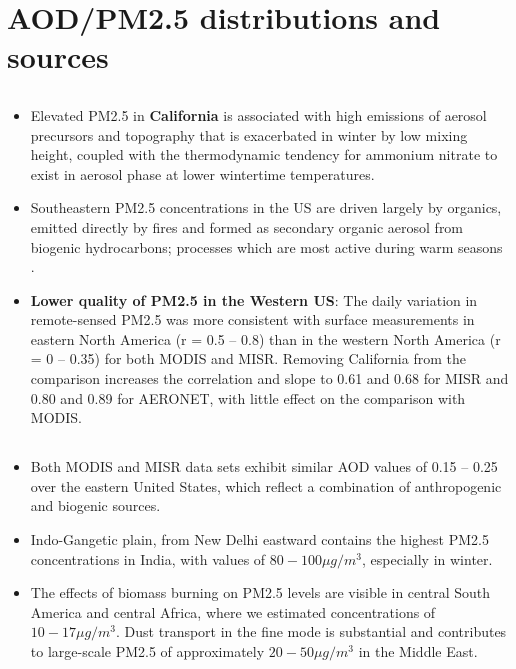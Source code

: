 \documentclass[11pt]{article}
\begin{document}

\section{AOD/PM2.5 distributions and sources}

\subsection{\citet{van2006estimating}}
\begin{itemize}
    \item Elevated PM2.5 in \textbf{California} is associated with high emissions of aerosol precursors and topography that is exacerbated in winter by low mixing height, coupled with the thermodynamic tendency for ammonium nitrate to exist in aerosol phase at lower wintertime temperatures. 
    \item Southeastern PM2.5 concentrations in the US are driven largely by organics, emitted directly by fires and formed as secondary organic aerosol from biogenic hydrocarbons; processes which are most active during warm seasons \citep{malm2004spatial}.
    \item \textbf{Lower quality of PM2.5 in the Western US}: The daily variation in remote-sensed PM2.5 was more consistent with surface measurements in eastern North America (r = 0.5 -- 0.8) than in the western North America (r = 0 -- 0.35) for both MODIS and MISR.  Removing California from the comparison increases the correlation and slope to 0.61 and 0.68 for MISR and 0.80 and 0.89 for AERONET, with little effect on the comparison with MODIS.
\end{itemize}

\subsection{\citet{van2010global}}
\begin{itemize}
    \item Both MODIS and MISR data sets exhibit similar AOD values of 0.15 -- 0.25 over the eastern United States, which reflect a combination of anthropogenic and biogenic sources.
    \item Indo-Gangetic plain, from New Delhi eastward contains the highest PM2.5 concentrations in India, with values of $80 - 100 \mu g/m^3$, especially in winter. 
    \item The effects of biomass burning on PM2.5 levels are visible in central South America and central Africa, where we estimated concentrations of $10 - 17 \mu g/m^3$. Dust transport in the fine mode is substantial \citep{jones2007modis} and contributes to large-scale PM2.5 of approximately $20 - 50 \mu g/m^3$ in the Middle East.
\end{itemize}



\end{document}
